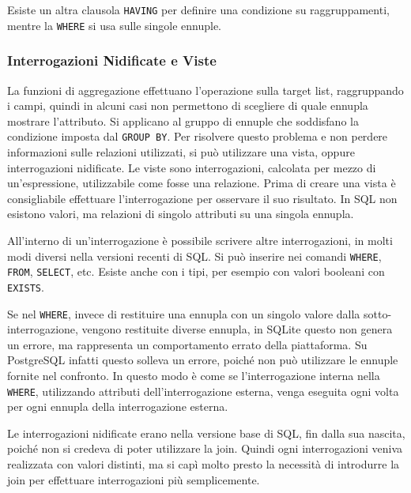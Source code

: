 \documentclass{article}
\numberwithin{equation}{subsection}
\begin{document}
Esiste un altra clausola \verb|HAVING| per definire una condizione su raggruppamenti, mentre la \verb|WHERE| si usa sulle singole ennuple. 


\subsubsection{Interrogazioni Nidificate e Viste}

La funzioni di aggregazione effettuano l'operazione sulla target list, raggruppando i campi, quindi in alcuni casi non permettono di scegliere di quale ennupla mostrare 
l'attributo. Si applicano al gruppo di ennuple che soddisfano la condizione imposta dal \verb|GROUP BY|. 
Per risolvere questo problema e non perdere informazioni sulle relazioni utilizzati, si può utilizzare una vista, oppure interrogazioni nidificate. Le viste sono 
interrogazioni, calcolata per mezzo di un'espressione, utilizzabile come fosse una relazione. Prima di creare una vista è consigliabile 
effettuare l'interrogazione per osservare il suo risultato. 
In SQL non esistono valori, ma relazioni di singolo attributi su una singola ennupla. 

All'interno di un'interrogazione è possibile scrivere altre interrogazioni, in molti modi diversi nella versioni recenti di SQL. Si può inserire nei comandi \verb|WHERE|, 
\verb|FROM|, \verb|SELECT|, etc. Esiste anche con i tipi, per esempio con valori booleani con \verb|EXISTS|. 

Se nel \verb|WHERE|, invece di restituire una ennupla con un singolo valore dalla sotto-interrogazione, vengono restituite diverse ennupla, in SQLite questo non genera 
un errore, ma rappresenta un comportamento errato della piattaforma. Su PostgreSQL infatti questo solleva un errore, poiché non può utilizzare le ennuple fornite nel 
confronto. In questo modo è come se l'interrogazione interna nella \verb|WHERE|, utilizzando attributi dell'interrogazione esterna, venga eseguita ogni volta per ogni 
ennupla della interrogazione esterna. 

Le interrogazioni nidificate erano nella versione base di SQL, fin dalla sua nascita, poiché non si credeva di poter utilizzare la join. Quindi ogni interrogazioni 
veniva realizzata con valori distinti, ma si capì molto presto la necessità di introdurre la join per effettuare interrogazioni più semplicemente. 
\end{document}
